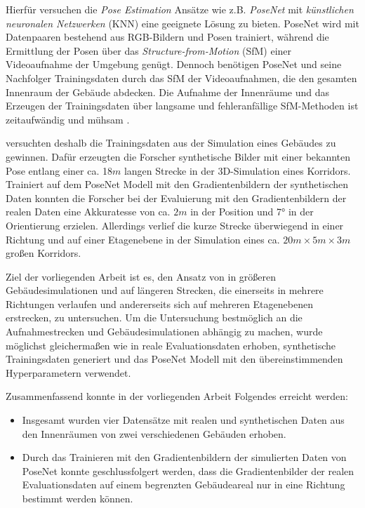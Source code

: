 Hierfür versuchen die \textit{Pose Estimation} Ansätze wie z.B. \textit{PoseNet} \cite{kendallPoseNetConvolutionalNetwork2015} mit \textit{künstlichen neuronalen Netzwerken} (KNN) eine geeignete Lösung zu bieten. PoseNet wird mit Datenpaaren bestehend aus RGB-Bildern und Posen trainiert, während die Ermittlung der Posen über das \textit{Structure-from-Motion} (SfM) einer Videoaufnahme der Umgebung genügt. Dennoch benötigen PoseNet und seine Nachfolger \cite{kendallModellingUncertaintyDeep2016, walchImageBasedLocalizationUsing2017, kendallGeometricLossFunctions2017, clarkVidLocDeepSpatioTemporal2017} Trainingsdaten durch das SfM der Videoaufnahmen, die den gesamten Innenraum der Gebäude abdecken. Die Aufnahme der Innenräume und das Erzeugen der Trainingsdaten über langsame und fehleranfällige SfM-Methoden ist zeitaufwändig und mühsam \cite{acharyaBIMPoseNetIndoorCamera2019}.

\citet{acharyaBIMPoseNetIndoorCamera2019} versuchten deshalb die Trainingsdaten aus der Simulation eines Gebäudes zu gewinnen. Dafür erzeugten die Forscher synthetische Bilder mit einer bekannten Pose entlang einer ca. 18$m$ langen Strecke in der 3D-Simulation eines Korridors. Trainiert auf dem PoseNet Modell mit den Gradientenbildern der synthetischen Daten konnten die Forscher \citet{acharyaBIMPoseNetIndoorCamera2019} bei der Evaluierung mit den Gradientenbildern der realen Daten eine Akkuratesse von ca. $2m$ in der Position und 7° in der Orientierung erzielen. 
Allerdings verlief die kurze Strecke überwiegend in einer Richtung und auf einer Etagenebene in der Simulation eines ca. $20m \times 5m \times 3m$ großen Korridors.


Ziel der vorliegenden Arbeit ist es, den Ansatz von \citet{acharyaBIMPoseNetIndoorCamera2019} in größeren Gebäudesimulationen und auf längeren Strecken, die einerseits in mehrere Richtungen verlaufen und andererseits sich auf mehreren Etagenebenen erstrecken, zu untersuchen. Um die Untersuchung bestmöglich an die Aufnahmestrecken und Gebäudesimulationen abhängig zu machen, wurde möglichst gleichermaßen wie in \cite{acharyaBIMPoseNetIndoorCamera2019} reale Evaluationsdaten erhoben, synthetische Trainingsdaten generiert und das PoseNet Modell mit den übereinstimmenden Hyperparametern verwendet.

Zusammenfassend konnte in der vorliegenden Arbeit Folgendes erreicht werden:
\begin{itemize}
	\item
	Insgesamt wurden vier Datensätze mit realen und synthetischen Daten aus den Innenräumen von zwei verschiedenen Gebäuden erhoben.
	\item 
	 Durch das Trainieren mit den Gradientenbildern der simulierten Daten von PoseNet konnte geschlussfolgert werden, dass die Gradientenbilder der realen Evaluationsdaten auf einem begrenzten Gebäudeareal nur in eine Richtung bestimmt werden können.
\end{itemize}





